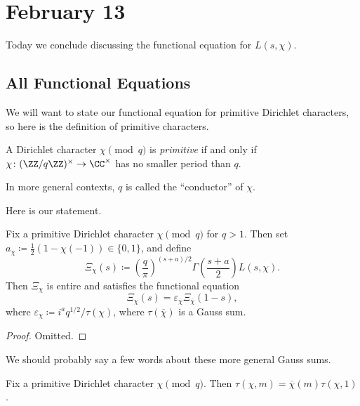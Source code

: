 \documentclass[../notes.tex]{subfiles}
\begin{document}
\section{February 13}

Today we conclude discussing the functional equation for $L(s,\chi)$.

\subsection{All Functional Equations}
We will want to state our functional equation for primitive Dirichlet characters, so here is the definition of primitive characters.
\begin{definition}[primitive]
	A Dirichlet character $\chi\pmod q$ is \textit{primitive} if and only if $\chi\colon(\ZZ/q\ZZ)^\times\to\CC^\times$ has no smaller period than $q$.
\end{definition}
\begin{remark}
	In more general contexts, $q$ is called the ``conductor'' of $\chi$.
\end{remark}
Here is our statement.
\begin{theorem} \label{thm:l-chi-func-eq}
	Fix a primitive Dirichlet character $\chi\pmod q$ for $q>1$. Then set $a_\chi\coloneqq\frac12(1-\chi(-1))\in\{0,1\}$, and define
	\[\Xi_\chi(s)\coloneqq\left(\frac q\pi\right)^{(s+a)/2}\Gamma\left(\frac{s+a}2\right)L(s,\chi).\]
	Then $\Xi_\chi$ is entire and satisfies the functional equation
	\[\Xi_\chi(s)=\varepsilon_{\overline\chi}\Xi_{\overline\chi}(1-s),\]
	where $\varepsilon_\chi\coloneqq i^aq^{1/2}/\tau(\chi)$, where $\tau(\overline\chi)$ is a Gauss sum.
\end{theorem}
\begin{proof}
	Omitted.
\end{proof}
We should probably say a few words about these more general Gauss sums.
\begin{lemma}
	Fix a primitive Dirichlet character $\chi\pmod q$. Then $\tau(\chi,m)=\overline\chi(m)\tau(\chi,1)$.
\end{lemma}
\end{document}

